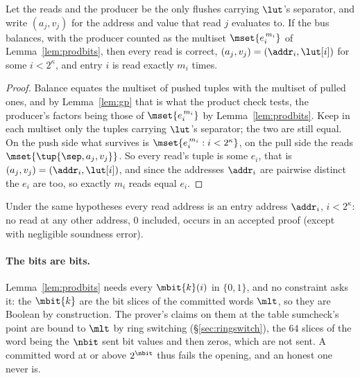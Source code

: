 \begin{theorem}\label{thm:omc}
Let the reads and the producer be the only flushes carrying $\lut$'s separator, and write $(a_j,v_j)$ for the address and value that read $j$ evaluates to. If the bus balances, with the producer counted as the multiset $\mset{e_i^{\,m_i}}$ of Lemma~\ref{lem:prodbits}, then every read is correct, $(a_j,v_j)=(\addr_i,\lut[i])$ for some $i<2^{\kappa}$, and entry $i$ is read exactly $m_i$ times.
\end{theorem}

\begin{proof}
Balance equates the multiset of pushed tuples with the multiset of pulled ones, and by Lemma~\ref{lem:gp} that is what the product check tests, the producer's factors being those of $\mset{e_i^{\,m_i}}$ by Lemma~\ref{lem:prodbits}. Keep in each multiset only the tuples carrying $\lut$'s separator; the two are still equal. On the push side what survives is $\mset{e_i^{\,m_i}:i<2^{\kappa}}$, on the pull side the reads $\mset{\tup{\sep,a_j,v_j}}$. So every read's tuple is some $e_i$, that is $(a_j,v_j)=(\addr_i,\lut[i])$, and since the addresses $\addr_i$ are pairwise distinct the $e_i$ are too, so exactly $m_i$ reads equal $e_i$.
\end{proof}

\begin{corollary}\label{cor:addrrange}
Under the same hypotheses every read address is an entry address $\addr_i$, $i<2^{\kappa}$: no read at any other address, $0$ included, occurs in an accepted proof (except with negligible soundness error).
\end{corollary}

\paragraph{The bits are bits.} Lemma~\ref{lem:prodbits} needs every $\mbit{k}(i)$ in $\{0,1\}$, and no constraint asks it: the $\mbit{k}$ are the bit slices of the committed words $\mlt$, so they are Boolean by construction. The prover's claims on them at the table sumcheck's point are bound to $\mlt$ by ring switching (\S\ref{sec:ringswitch}), the $64$ slices of the word being the $\nbit$ sent bit values and then zeros, which are not sent. A committed word at or above $2^{\nbit}$ thus fails the opening, and an honest one never is.

